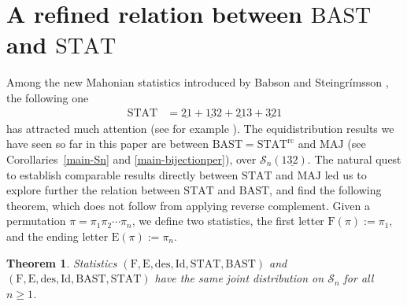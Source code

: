 \documentclass[12pt]{amsart}
\numberwithin{equation}{section}
\theoremstyle{plain}
\newtheorem{theorem}{Theorem}[section]
\theoremstyle{definition}
\def\MAJ{\mathrm{MAJ}}
\def\STAT{\mathrm{STAT}}
\def\BAST{\mathrm{BAST}}
\def\F{\mathrm{F}}
\def\L{\mathrm{E}}
\def\des{\mathrm{des}}
\def\rc{\mathrm{rc}}
\def\Id{\mathrm{Id}}
\def\SS{\mathcal{S}}
\begin{document}
\section{\texorpdfstring{A refined relation between $\BAST$ and $\STAT$}{}}\label{sec:stat-bast}
Among the new Mahonian statistics introduced by Babson and Steingr\'imsson \cite{BS}, the following one
\begin{align}\label{def:stat}
\STAT &=\underline{21}+\underline{13}2+\underline{21}3+\underline{32}1
\end{align}
has attracted much attention (see for example \cite{FZ,Bur,KV,CL,FHV}). The equidistribution results we have seen so far in this paper are between $\BAST=\STAT^{\rc}$ and $\MAJ$ (see Corollaries~\ref{main-Sn} and \ref{main-bijectionper}), over $\SS_n(1\underline{32})$. The natural quest to establish comparable results directly between $\STAT$ and $\MAJ$ led us to explore further the relation between $\STAT$ and $\BAST$, and find the following theorem, which does not follow from applying reverse complement. Given a permutation $\pi=\pi_1\pi_2\cdots\pi_n$, we define two statistics, the first letter $\F(\pi):=\pi_1$, and the ending letter $\L(\pi):=\pi_n$.
\begin{theorem}\label{thm:stat-bast}
Statistics $(\F, \L, \des, \Id, \STAT, \BAST)$ and
$(\F, \L, \des, \Id, \BAST, \STAT)$ have the same joint distribution on $\SS_n$ for all $n \geq 1$.
\end{theorem}
\end{document}
